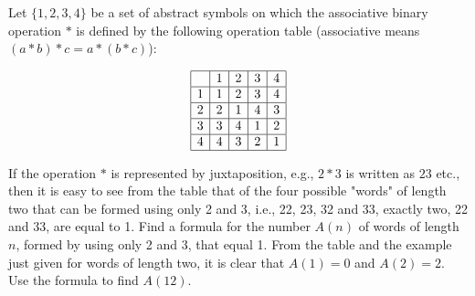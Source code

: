 Let $\lbrace 1, 2, 3, 4 \rbrace$ be a set of abstract symbols on which the
associative binary operation $*$ is defined by the following operation table
(associative means $(a * b) * c = a * (b * c)$):

$$
\begin{array}{|c|c|c|c|c|}
\hline
\* & 1 & 2 & 3 & 4 \\ \hline
 1 & 1 & 2 & 3 & 4 \\ \hline
 2 & 2 & 1 & 4 & 3 \\ \hline
 3 & 3 & 4 & 1 & 2 \\ \hline
 4 & 4 & 3 & 2 & 1 \\ \hline
\end{array}
$$

If the operation $*$ is represented by juxtaposition, e.g., $2 * 3$ is written
as $23$ etc., then it is easy to see from the table that of the four possible
"words" of length two that can be formed using only 2 and 3, i.e., 22, 23, 32
and 33, exactly two, 22 and 33, are equal to 1. Find a formula for the number
$A(n)$ of words of length $n$, formed by using only 2 and 3, that equal 1. From
the table and the example just given for words of length two, it is clear that
$A(1) = 0$ and $A(2) = 2$. Use the formula to find $A(12)$.
